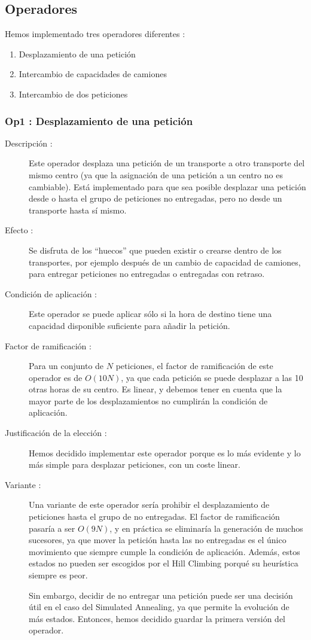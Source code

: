 \documentclass{article}
\begin{document}
\subsection{Operadores}

\noindent Hemos implementado tres operadores diferentes :
\begin{enumerate}
\item Desplazamiento de una petición
\item Intercambio de capacidades de camiones
\item Intercambio de dos peticiones
\end{enumerate}

\subsubsection{Op1 : Desplazamiento de una petición}

\begin{description}
\item[Descripción :] Este operador desplaza una petición de un transporte a
otro transporte del mismo centro (ya que la asignación de una petición a un
centro no es cambiable). Está implementado para que sea posible desplazar una
petición desde o hasta el grupo de peticiones no entregadas, pero no desde un
transporte hasta sí mismo.
\item[Efecto :] Se disfruta de los ``huecos'' que pueden existir o crearse
dentro de los transportes, por ejemplo después de un cambio de capacidad de
camiones, para entregar peticiones no entregadas o entregadas con retraso.
\item[Condición de aplicación :] Este operador se puede aplicar sólo si la
hora de destino tiene una capacidad disponible suficiente para añadir la
petición.
\item[Factor de ramificación :] Para un conjunto de $N$ peticiones, el factor de
ramificación de este operador es de $O(10N)$, ya que cada petición se puede
desplazar a las 10 otras horas de su centro. Es linear, y debemos tener en
cuenta que la mayor parte de los desplazamientos no cumplirán la condición de
aplicación.
\item[Justificación de la elección :]
Hemos decidido implementar este operador porque es lo más evidente y lo más 
simple para desplazar peticiones, con un coste linear.
\item[Variante :] Una variante de este operador sería prohibir el desplazamiento
de peticiones hasta el grupo de no entregadas. El factor de ramificación pasaría
a ser $O(9N)$, y en práctica se eliminaría la generación de muchos sucesores,
ya que mover la petición hasta las no entregadas es el único movimiento que
siempre cumple la condición de aplicación. Además, estos estados no pueden ser
escogidos por el Hill Climbing porqué su heurística siempre es peor.

Sin embargo, decidir de no entregar una petición puede ser una decisión útil en
el caso del Simulated Annealing, ya que permite la evolución de más estados.
Entonces, hemos decidido guardar la primera versión del operador.
\end{description}
\end{document}
